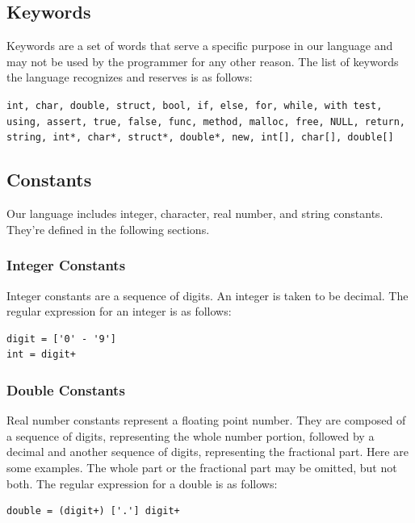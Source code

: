 \documentclass{article}
\begin{document}
\subsection{Keywords}
Keywords are a set of words that serve a specific purpose in our language and may not be used by the programmer for any other reason.  The list of keywords the language recognizes and reserves is as follows: 

\texttt{int, char, double, struct, bool, if, else, for, while, with test, using, assert, true, false, func, method, malloc, free, NULL, return, string, int*, char*, struct*, double*, new, int[], char[], double[]}

\subsection{Constants}
Our language includes integer, character, real number, and string constants. They're defined in the following sections.

\subsubsection{Integer Constants}
Integer constants are a sequence of digits. An integer is taken to be decimal. The regular expression for an integer is as follows:

\begin{Verbatim}[frame=single]
digit = ['0' - '9']
int = digit+

\end{Verbatim}

\subsubsection{Double Constants}
Real number constants represent a floating point number. They are composed of a sequence of digits, representing the whole number portion, followed by a decimal and another sequence of digits, representing the fractional part. Here are some examples. The whole part or the fractional part may be omitted, but not both.  The regular expression for a double is as follows:

\begin{Verbatim}[frame=single]
double = (digit+) ['.'] digit+
\end{Verbatim}
\end{document}
